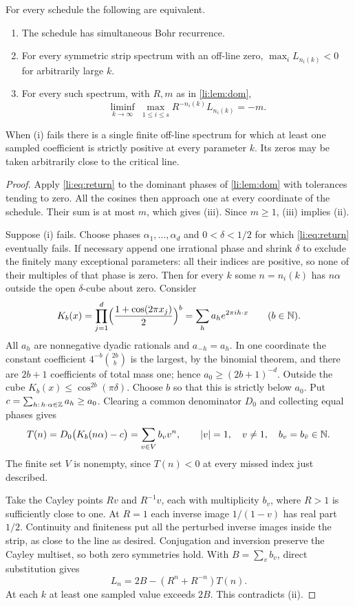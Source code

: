\begin{theorem}\label{li:thm:sampling}
For every schedule the following are equivalent.
\begin{enumerate}[label=\textup{(\roman*)}]
\item The schedule has simultaneous Bohr recurrence.
\item For every symmetric strip spectrum with an off-line zero, $\max_iL_{n_i(k)}<0$ for
 arbitrarily large $k$.
\item For every such spectrum, with $R,m$ as in \cref{li:lem:dom},
 \[
  \liminf_{k\to\infty}\ \max_{1\le i\le s}R^{-n_i(k)}L_{n_i(k)}=-m .
 \]
\end{enumerate}
When \textup{(i)} fails there is a single finite off-line spectrum for which at least one
sampled coefficient is strictly positive at every parameter $k$. Its zeros may be taken
arbitrarily close to the critical line.
\end{theorem}

\begin{proof}
Apply \eqref{li:eq:return} to the dominant phases of \cref{li:lem:dom} with tolerances tending
to zero. All the cosines then approach one at every coordinate of the schedule. Their sum is
at most $m$, which gives (iii). Since $m\ge1$, (iii) implies (ii).

Suppose (i) fails. Choose phases $\alpha_1,\dots,\alpha_d$ and $0<\delta<1/2$ for which
\eqref{li:eq:return} eventually fails. If necessary append one irrational phase and shrink
$\delta$ to exclude the finitely many exceptional parameters: all their indices are positive,
so none of their multiples of that phase is zero. Then for every $k$ some $n=n_i(k)$ has
$n\alpha$ outside the open $\delta$-cube about zero. Consider
\[
 K_b(x)=\prod_{j=1}^d\Bigl(\frac{1+\cos(2\pi x_j)}2\Bigr)^b=\sum_ha_he^{2\pi ih\cdot x}\qquad(b\in\mathbb{N}).
\]
All $a_h$ are nonnegative dyadic rationals and $a_{-h}=a_h$. In one coordinate the constant
coefficient $4^{-b}\binom{2b}b$ is the largest, by the binomial theorem, and there are $2b+1$
coefficients of total mass one; hence $a_0\ge(2b+1)^{-d}$. Outside the cube
$K_b(x)\le\cos^{2b}(\pi\delta)$. Choose $b$ so that this is strictly below $a_0$. Put
$c=\sum_{h:\,h\cdot\alpha\in\mathbb{Z}}a_h\ge a_0$. Clearing a common denominator $D_0$ and collecting
equal phases gives
\[
 T(n)=D_0\bigl(K_b(n\alpha)-c\bigr)=\sum_{v\in V}b_vv^n,\qquad\lvert v\rvert=1,\quad v\ne1,\quad
 b_v=b_{\bar v}\in\mathbb{N} .
\]
The finite set $V$ is nonempty, since $T(n)<0$ at every missed index just described.

Take the Cayley points $Rv$ and $R^{-1}v$, each with multiplicity $b_v$, where $R>1$ is
sufficiently close to one. At $R=1$ each inverse image $1/(1-v)$ has real part $1/2$.
Continuity and finiteness put all the perturbed inverse images inside the strip, as close to
the line as desired. Conjugation and inversion preserve the Cayley multiset, so both zero
symmetries hold. With $B=\sum_vb_v$, direct substitution gives
\begin{equation}\label{li:eq:counter}
 L_n=2B-(R^n+R^{-n})T(n).
\end{equation}
At each $k$ at least one sampled value exceeds $2B$. This contradicts (ii).
\end{proof}

